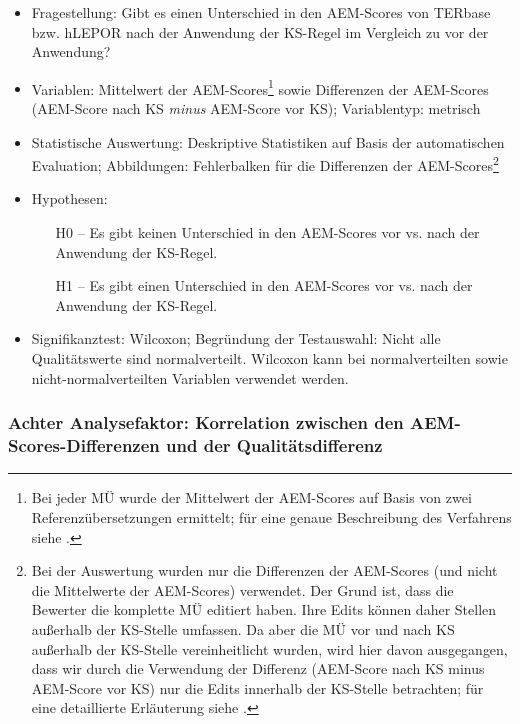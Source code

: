 \begin{itemize}
\item Fragestellung: Gibt es einen Unterschied in den AEM-Scores von TERbase bzw. hLEPOR nach der Anwendung der KS-Regel im Vergleich zu vor der Anwendung?
\item Variablen: Mittelwert der AEM-Scores\footnote{{{{Bei jeder MÜ wurde der Mittelwert der AEM-Scores auf Basis von zwei Referenzübersetzungen ermittelt; für eine genaue Beschreibung des Verfahrens siehe .}}}} sowie Differenzen der AEM-Scores (AEM-Score nach KS \textit{minus} AEM-Score vor KS); Variablentyp: metrisch
\item Statistische Auswertung: Deskriptive Statistiken auf Basis der automatischen Evaluation; Abbildungen: Fehlerbalken für die Differenzen der AEM-Scores\footnote{{{{Bei der Auswertung wurden nur die Differenzen der AEM-Scores (und nicht die Mittelwerte der AEM-Scores) verwendet. Der Grund ist, dass die Bewerter die komplette MÜ editiert haben. Ihre Edits können daher Stellen außerhalb der KS-Stelle umfassen. Da aber die MÜ vor und nach KS außerhalb der KS-Stelle vereinheitlicht wurden, wird hier davon ausgegangen, dass wir durch die Verwendung der Differenz (AEM-Score nach KS minus AEM-Score vor KS) nur die Edits innerhalb der KS-Stelle betrachten; für eine detaillierte Erläuterung siehe .}}}}
\item Hypothesen:
  \begin{itemize}[align = left]

  \item[H0 --] Es gibt keinen Unterschied in den AEM-Scores vor vs. nach der Anwendung der KS-Regel.

  \item[H1 --] Es gibt einen Unterschied in den AEM-Scores vor vs. nach der Anwendung der KS-Regel.

  \end{itemize}
\item Signifikanztest: Wilcoxon; Begründung der Testauswahl: Nicht alle Qualitätswerte sind normalverteilt. Wilcoxon kann bei normalverteilten sowie nicht-normalverteilten Variablen verwendet werden.
\end{itemize}

\subsubsection{Achter Analysefaktor: Korrelation zwischen den AEM-Scores-Differenzen und der Qualitätsdifferenz}

